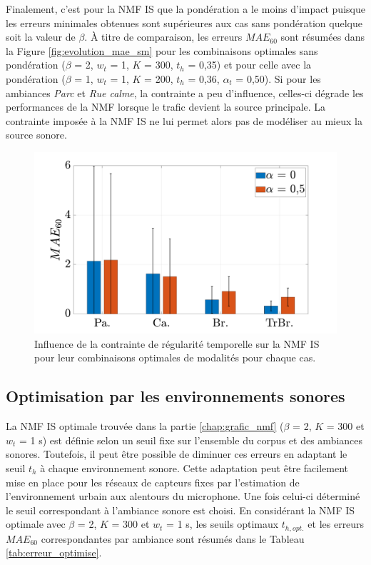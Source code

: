 Finalement, c'est pour la NMF IS que la pondération a le moins d'impact puisque les erreurs minimales obtenues sont supérieures aux cas sans pondération quelque soit la valeur de $\beta$. \`A titre de comparaison, les erreurs $MAE_{60}$ sont résumées dans la Figure \ref{fig:evolution_mae_sm} pour les combinaisons optimales sans pondération ($\beta$ = 2, $w_t$ = 1, $K$ = 300, $t_h$ = 0,35) et pour celle avec la pondération ($\beta$ = 1, $w_t$ = 1, $K$ = 200, $t_h$ = 0,36, $\alpha_t$ = 0,50). Si pour les ambiances \textit{Parc} et \textit{Rue calme}, la contrainte a peu d'influence, celles-ci dégrade les performances de la NMF lorsque le trafic devient la source principale. La contrainte imposée à la NMF IS ne lui permet alors pas de modéliser au mieux la source sonore. 

\begin{figure}[h]
\centering
\includegraphics[width=.7\linewidth]{./figures/resultats/bar_TI_smooth.pdf}
\caption{Influence de la contrainte de régularité temporelle sur la NMF IS pour leur combinaisons optimales de modalités pour chaque cas.}
\label{fig:dist_grafic_sm}
\end{figure}


\subsection{Optimisation par les environnements sonores}\label{part:optimisationESU}


La NMF IS optimale trouvée dans la partie \ref{chap:grafic_nmf} ($\beta$ = 2, $K$ = 300 et $w_t$ = 1 s) est définie selon un seuil fixe sur l'ensemble du corpus et des ambiances sonores. Toutefois, il peut être possible de diminuer ces erreurs en adaptant le seuil $t_h$ à chaque environnement sonore. 
Cette adaptation peut être facilement mise en place pour les réseaux de capteurs fixes par l'estimation de l'environnement urbain aux alentours du microphone. Une fois celui-ci déterminé le seuil correspondant à l'ambiance sonore est choisi. 
En considérant la NMF IS optimale avec $\beta$ = 2, $K$ = 300 et $w_t$ = 1 s, les seuils optimaux $t_{h,opt.}$ et les erreurs $MAE_{60}$ correspondantes par ambiance sont résumés dans le Tableau \ref{tab:erreur_optimise}.

